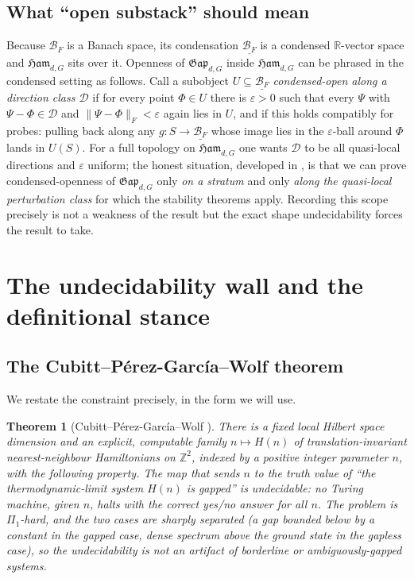 \documentclass[12pt]{article}
\newcommand{\cond}[1]{\underline{#1}}          %
\newcommand{\Ffun}{F}                          %
\newcommand{\BF}{\mathcal{B}_{F}}              %
\newcommand{\Ham}{\mathfrak{Ham}}              %
\newcommand{\Gap}{\mathfrak{Gap}}              %
\newcommand{\R}{\mathbb{R}}
\newcommand{\Z}{\mathbb{Z}}
\newcommand{\norm}[1]{\lVert #1 \rVert}
\theoremstyle{plain}
\newtheorem{theorem}{Theorem}[section]
\theoremstyle{definition}
\theoremstyle{remark}
\begin{document}
\subsection{What ``open substack'' should mean}
\label{sec:framework-open}

Because $\BF$ is a Banach space, its condensation $\cond{\BF}$ is a condensed
$\R$-vector space and $\Ham_{d,G}$ sits over it. Openness of $\Gap_{d,G}$ inside
$\Ham_{d,G}$ can be phrased in the condensed setting as follows. Call a subobject
$U\subseteq\cond{\BF}$ \emph{condensed-open along a direction class $\mathcal{D}$} if
for every point $\Phi\in U$ there is $\varepsilon>0$ such that every $\Psi$ with
$\Psi-\Phi\in\mathcal{D}$ and $\norm{\Psi-\Phi}_{\Ffun}<\varepsilon$ again lies in
$U$, and if this holds compatibly for probes: pulling back along any $g:S\to\cond{\BF}$
whose image lies in the $\varepsilon$-ball around $\Phi$ lands in $U(S)$. For a full
topology on $\Ham_{d,G}$ one wants $\mathcal{D}$ to be all quasi-local directions and
$\varepsilon$ uniform; the honest situation, developed in , is
that we can prove condensed-openness of $\Gap_{d,G}$ only \emph{on a stratum} and
only \emph{along the quasi-local perturbation class} for which the stability theorems
apply. Recording this scope precisely is not a weakness of the result but the exact
shape undecidability forces the result to take.

\section{The undecidability wall and the definitional stance}
\label{sec:wall}

\subsection{The Cubitt--P\'erez-Garc\'ia--Wolf theorem}
\label{sec:wall-cpw}

We restate the constraint precisely, in the form we will use.

\begin{theorem}[Cubitt--P\'erez-Garc\'ia--Wolf \cite{cpw-undecidable}]
\label{thm:cpw}
There is a fixed local Hilbert space dimension and an explicit, computable family
$n\mapsto H(n)$ of translation-invariant nearest-neighbour Hamiltonians on
$\Z^2$, indexed by a positive integer parameter $n$, with the following property.
The map that sends $n$ to the truth value of ``the thermodynamic-limit system
$H(n)$ is gapped'' is undecidable: no Turing machine, given $n$, halts with the
correct yes/no answer for all $n$. The problem is $\Pi_1$-hard, and the two cases are
sharply separated (a gap bounded below by a constant in the gapped case, dense
spectrum above the ground state in the gapless case), so the undecidability is not an
artifact of borderline or ambiguously-gapped systems.
\end{theorem}
\end{document}
